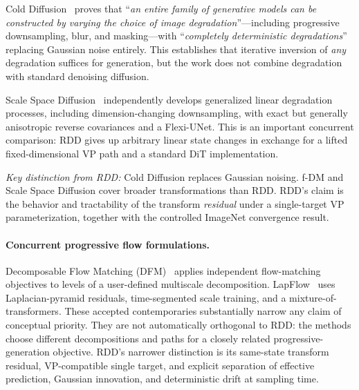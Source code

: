 \documentclass[10pt]{article}
\begin{document}
Cold Diffusion~\citep{bansal2022cold} proves that ``\emph{an entire family of generative models can be constructed by varying the choice of image degradation}''---including progressive downsampling, blur, and masking---with ``\emph{completely deterministic degradations}'' replacing Gaussian noise entirely.
This establishes that iterative inversion of \emph{any} degradation suffices for generation, but the work does not combine degradation with standard denoising diffusion.

Scale Space Diffusion~\citep{mukhopadhyay2026ssd} independently develops generalized linear degradation processes, including dimension-changing downsampling, with exact but generally anisotropic reverse covariances and a Flexi-UNet. This is an important concurrent comparison: RDD gives up arbitrary linear state changes in exchange for a lifted fixed-dimensional VP path and a standard DiT implementation.

\emph{Key distinction from RDD:} Cold Diffusion replaces Gaussian noising. f-DM and Scale Space Diffusion cover broader transformations than RDD. RDD's claim is the behavior and tractability of the transform \emph{residual} under a single-target VP parameterization, together with the controlled ImageNet convergence result.

\paragraph{Concurrent progressive flow formulations.}
Decomposable Flow Matching (DFM)~\citep{hajiali2025dfm} applies independent flow-matching objectives to levels of a user-defined multiscale decomposition. LapFlow~\citep{zhao2026lapflow} uses Laplacian-pyramid residuals, time-segmented scale training, and a mixture-of-transformers. These accepted contemporaries substantially narrow any claim of conceptual priority. They are not automatically orthogonal to RDD: the methods choose different decompositions and paths for a closely related progressive-generation objective. RDD's narrower distinction is its same-state transform residual, VP-compatible single target, and explicit separation of effective prediction, Gaussian innovation, and deterministic drift at sampling time.
\end{document}
